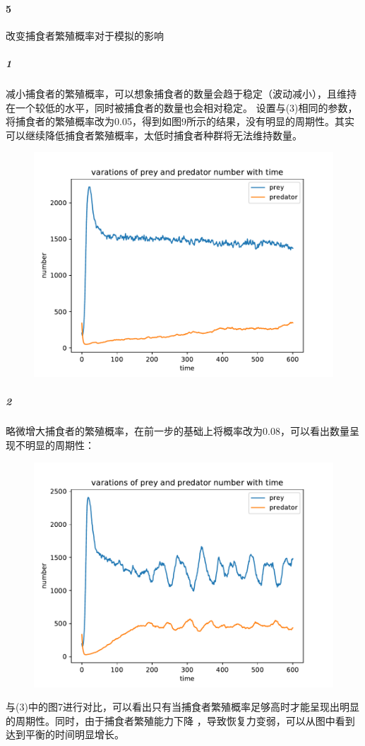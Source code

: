 \documentclass[a4paper]{ctexart}
\begin{document}
	\paragraph{5}改变捕食者繁殖概率对于模拟的影响
	\subparagraph{1}
	减小捕食者的繁殖概率，可以想象捕食者的数量会趋于稳定（波动减小），且维持在一个较低的水平，同时被捕食者的数量也会相对稳定。
	设置与(3)相同的参数，将捕食者的繁殖概率改为0.05，得到如图9所示的结果，没有明显的周期性。其实可以继续降低捕食者繁殖概率，太低时捕食者种群将无法维持数量。
	\begin{figure}[htbp]
		\centering 
		\includegraphics[scale=0.6]{demo7.pdf}
		\caption{}
	\end{figure}
	\subparagraph{2}
	略微增大捕食者的繁殖概率，在前一步的基础上将概率改为0.08，可以看出数量呈现不明显的周期性：
	\begin{figure}[htpb]
		\centering
		\includegraphics[scale=0.6]{demo8.pdf}
		\caption{}
	\end{figure}
	与(3)中的图7进行对比，可以看出只有当捕食者繁殖概率足够高时才能呈现出明显的周期性。同时，由于捕食者繁殖能力下降
	，导致恢复力变弱，可以从图中看到达到平衡的时间明显增长。
\end{document}
